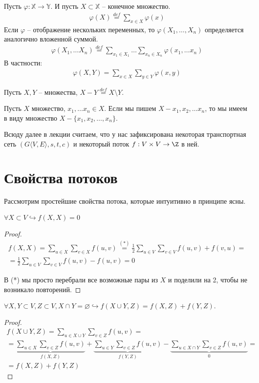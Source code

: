 \Def Пусть $\varphi: \mathbb{X} \to \mathbb{Y}$. И пусть $X \subset \mathbb{X}$ -- конечное множество.
\begin{eqnarray*}
    \varphi(X) \overset{def}{=} \sum\limits_{x \in X} \varphi(x)
\end{eqnarray*}
Если $\varphi$ -- отображение нескольких переменных, то $\varphi(X_1, \dots, X_n)$ определяется аналогично вложенной суммой.
\begin{eqnarray*}
    \varphi(X_1, \dots X_n) \overset{def}{=} \sum\limits_{x_1 \in X_1} \dots \sum\limits_{x_n \in X_n} \varphi(x_1, \dots x_n)
\end{eqnarray*}
В частности:
\begin{eqnarray*}
    \varphi(X, Y) = \sum\limits_{x \in X} \sum\limits_{y \in Y} \varphi(x, y)
\end{eqnarray*}

\Def Пусть $X, Y$ -- множества, $X - Y \overset{def}{=} X \setminus Y$.

\Def Пусть $X$ множество, $x_1, \dots x_n \in X$. Если мы пишем $X - x_1, x_2, \dots x_n$, то мы имеем в виду множество $X - \{x_1, x_2, \dots, x_n\}$.

Всюду далее в лекции считаем, что у нас зафиксирована некоторая транспортная сеть $(G\langle V, E \rangle, s, t, c)$ и некоторый поток $f: V \times V \to \Z$ в ней.

\section{Свойства потоков}

Рассмотрим простейшие свойства потока, которые интуитивно в принципе ясны.

\St $\forall X \subset V \hookrightarrow f(X, X) = 0$
\begin{proof}
    \begin{multline*}
        f(X, X) = \sum\limits_{u \in X} \sum\limits_{v \in X} f(u, v) \overset{(*)}{=} \frac{1}{2} \sum\limits_{u \in V} \sum\limits_{v \in V} f(u, v) + f(v, u) = \\
        = \frac{1}{2} \sum\limits_{u \in V} \sum\limits_{v \in V} f(u, v) - f(u, v) = 0
    \end{multline*}

    В (*) мы просто перебрали все возможные пары из $X$ и поделили на 2, чтобы не возникало повторений.
\end{proof}

\St $\forall X, Y \subset V, Z \subset V, X \cap Y = \varnothing \hookrightarrow f(X \cup Y, Z) = f(X, Z) + f(Y, Z)$.
\begin{proof}
    \begin{multline*}
        f(X \cup Y, Z) = \sum\limits_{u \in X \cup Y} \sum\limits_{v \in Z} f(u, v) = \\ 
        = \underbrace{\sum\limits_{u \in X} \sum\limits_{v \in Z} f(u, v)}_{f(X, Z)} +  \underbrace{\sum\limits_{u \in Y} \sum\limits_{v \in Z} f(u, v)}_{f(Y, Z)} - \underbrace{\sum\limits_{u \in X \cap Y} \sum\limits_{v \in Z} f(u, v)}_{0} = \\
        = f(X, Z) + f(Y, Z)
    \end{multline*}
\end{proof}

